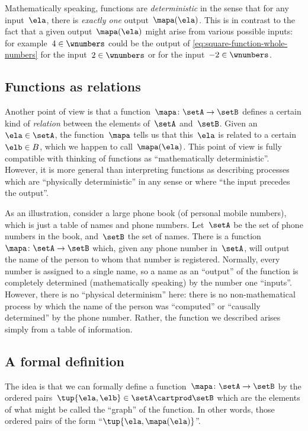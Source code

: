 Mathematically speaking, functions are \emph{deterministic} in the sense that for any input~$\ela$, there is \emph{exactly one} output~$\mapa(\ela)$.
This is in contrast to the fact that a given output~$\mapa(\ela)$ might arise from various possible inputs: for example~$4 \in \wnumbers$ could be the output of \cref{eq:square-function-whole-numbers} for the input~$2 \in \wnumbers$ or for the input~$-2 \in \wnumbers$.

\subsection{Functions as relations}

Another point of view is that a function~$\mapa\colon \setA \to \setB$ defines a certain kind of \emph{relation} between the elements of~$\setA$ and~$\setB$.
Given an~$\ela \in \setA$, the function~$\mapa$ tells us that this~$\ela$ is related to a certain~$\elb \in B$, which we happen to call~$\mapa(\ela)$.
This point of view is fully compatible with thinking of functions as ``mathematically deterministic''.
However, it is more general than interpreting functions as describing processes which are ``physically deterministic'' in any sense or where ``the input precedes the output''.

As an illustration, consider a large phone book (of personal mobile numbers), which is just a table of names and phone numbers.
Let~$\setA$ be the set of phone numbers in the book, and~$\setB$ the set of names.
There is a function~$\mapa\colon \setA \to \setB$ which, given any phone number in~$\setA$, will output the name of the person to whom that number is registered.
Normally, every number is assigned to a single name, so a name as an ``output'' of the function is completely determined (mathematically speaking) by the number one ``inputs''.
However, there is no ``physical determinism'' here: there is no non-mathematical process by which the name of the person was ``computed'' or ``causally determined'' by the phone number.
Rather, the function we described arises simply from a table of information.

\subsection{A formal definition}

The idea is that we can formally define a function~$\mapa\colon \setA \to \setB$ by the ordered pairs~$\tup{\ela, \elb} \in \setA \cartprod \setB$ which are the elements of what might be called the ``graph'' of the function.
In other words, those ordered pairs of the form ``$\tup{\ela, \mapa(\ela)}$''.

